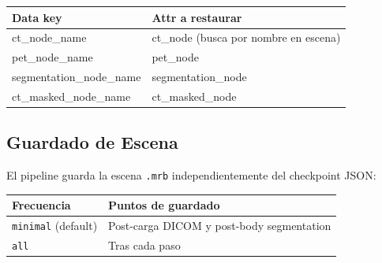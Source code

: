 \documentclass[12pt,a4paper]{article}
\begin{document}
\begin{table}[H]
\centering
\begin{tabular}{l l}
\toprule
\textbf{Data key} & \textbf{Attr a restaurar} \\
\midrule
ct\_node\_name & ct\_node (busca por nombre en escena) \\
pet\_node\_name & pet\_node \\
segmentation\_node\_name & segmentation\_node \\
ct\_masked\_node\_name & ct\_masked\_node \\
\bottomrule
\end{tabular}
\end{table}

\subsection{Guardado de Escena}

El pipeline guarda la escena \texttt{.mrb} independientemente del checkpoint JSON:

\begin{table}[H]
\centering
\begin{tabular}{l l}
\toprule
\textbf{Frecuencia} & \textbf{Puntos de guardado} \\
\midrule
\texttt{minimal} (default) & Post-carga DICOM y post-body segmentation \\
\texttt{all} & Tras cada paso \\
\bottomrule
\end{tabular}
\end{table}
\end{document}
